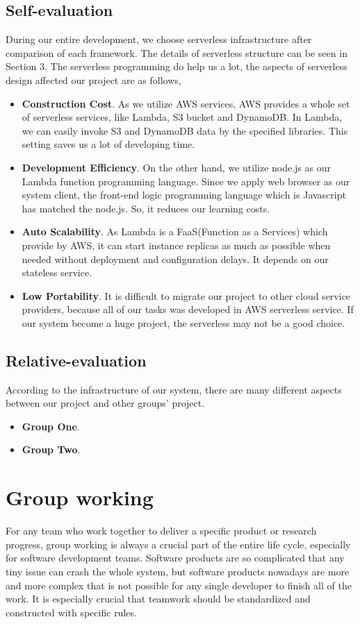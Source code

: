 \documentclass[runningheads]{llncs}
\begin{document}
\subsection{Self-evaluation}
During our entire development, we choose serverless infrastructure after comparison of each framework. The details of serverless structure can be seen in Section 3. The serverless programming do help us a lot, the aspects of serverless design affected our project are as follows, 

\begin{itemize}
	\item \textbf{Construction Cost}. As we utilize AWS services, AWS provides a whole set of serverless services, like Lambda, S3 bucket and DynamoDB. In Lambda, we can easily invoke S3 and DynamoDB data by the specified libraries. This setting saves us a lot of developing time.
	\item \textbf{Development Efficiency}. On the other hand, we utilize node.js as our Lambda function programming language. Since we apply web browser as our system client, the front-end logic programming language which is Javascript has matched the node.js. So, it reduces our learning costs. 
	\item \textbf{Auto Scalability}. As Lambda is a FaaS(Function as a Services) which provide by AWS, it can start instance replicas as much as possible when needed without deployment and configuration delays. It depends on our stateless service.
	\item \textbf{Low Portability}. It is difficult to migrate our project to other cloud service providers, because all of our tasks was developed in AWS serverless service. If our system become a huge project, the serverless may not be a good choice.
\end{itemize}

\subsection{Relative-evaluation}
According to the infrastructure of our system, there are many different aspects between our project and other groups' project. 
\begin{itemize}
	\item \textbf{Group One}.
	\item \textbf{Group Two}.
\end{itemize}

\section{Group working}   
For any team who work together to deliver a specific product or research progress, group working is always a crucial part of the entire life cycle, especially for software development teams. Software products are so complicated that any tiny issue can crash the whole system, but software products nowadays are more and more complex that is not possible for any single developer to finish all of the work. It is especially crucial that teamwork should be standardized and constructed with specific rules.
\end{document}
